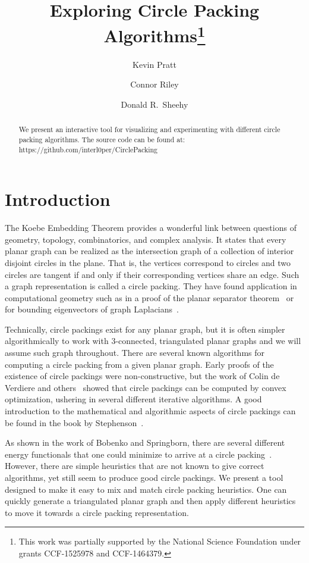\documentclass[a4paper,UKenglish]{lipics-v2016}
\title{Exploring Circle Packing Algorithms\footnote{This work was partially supported by the National Science Foundation under grants CCF-1525978 and CCF-1464379.}}
\author[1]{Kevin Pratt}
\author[2]{Connor Riley}
\author[3]{Donald R.~Sheehy}
\affil[1]{University of Connecticut\\
  \texttt{kevin.pratt@uconn.edu}}
\affil[2]{University of Connecticut\\
  \texttt{connor.riley@uconn.edu}}
\affil[3]{University of Connecticut\\
  \texttt{don.r.sheehy@gmail.com}}
\begin{document}
\maketitle

\begin{abstract}
  We present an interactive tool for visualizing and experimenting with different circle packing algorithms. 
  The source code can be found at: https://github.com/interl0per/CirclePacking
\end{abstract}

\section{Introduction}
\label{sec:introduction}

  The Koebe Embedding Theorem provides a wonderful link between questions of geometry, topology, combinatorics, and complex analysis.
  It states that every planar graph can be realized as the intersection graph of a collection of interior disjoint circles in the plane.
  That is, the vertices correspond to circles and two circles are tangent if and only if their corresponding vertices share an edge.
  Such a graph representation is called a circle packing.
  They have found application in computational geometry such as in a proof of the planar separator theorem~\cite{miller97separators} or for bounding eigenvectors of graph Laplacians~\cite{kelner06spectral}.
  
  Technically, circle packings exist for any planar graph, but it is often simpler algorithmically to work with $3$-connected, triangulated planar graphs and we will assume such graph throughout.
  There are several known algorithms for computing a circle packing from a given planar graph.
  Early proofs of the existence of circle packings were non-constructive, but the work of Colin de Verdiere\cite{colindeverdiere91principe} and others~\cite{mohar93polynomial,bobenko03variational} showed that circle packings can be computed by convex optimization, ushering in several different iterative algorithms.
  A good introduction to the mathematical and algorithmic aspects of circle packings can be found in the book by Stephenson~\cite{stephenson05introduction}.
  
  As shown in the work of Bobenko and Springborn, there are several different energy functionals that one could minimize to arrive at a circle packing~\cite{bobenko03variational}.
  However, there are simple heuristics that are not known to give correct algorithms, yet still seem to produce good circle packings. 
  We present a tool designed to make it easy to mix and match circle packing heuristics. 
  One can quickly generate a triangulated planar graph and then apply different heuristics to move it towards a circle packing representation.
\end{document}

